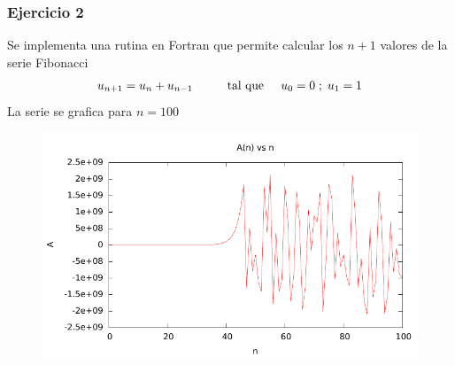 \subsubsection{Ejercicio 2}
Se implementa una rutina en Fortran que permite calcular los $n+1$ valores de la serie Fibonacci
\begin{equation}
u_{n+1} = u_{n} + u_{n-1} \hspace{1cm} \mbox{tal que} \hspace{0,5cm} u_0=0 \hspace{0,1cm} ; \hspace{0,1cm} u_1=1
\end{equation}
La serie se grafica para $n=100$

\begin{figure} [H]
\includegraphics{./parte2/graficos/grafico_p2.pdf}
\caption{} \label{fig_P1_2}
\end{figure}